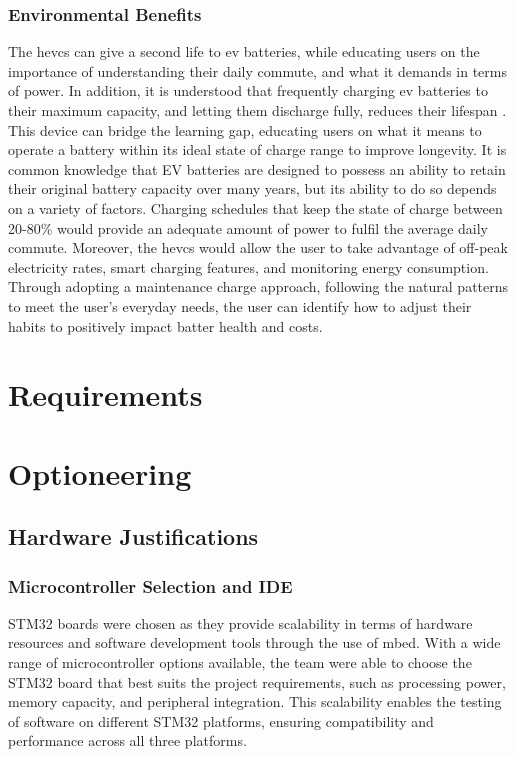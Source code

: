 \documentclass [12pt]{article}
\begin{document}
\subsubsection{Environmental Benefits}
The \gls{hevcs} can give a second life to \gls{ev} batteries, while educating users on the importance of understanding their daily commute, and what it demands in terms of power. In addition, it is understood that frequently charging \gls{ev} batteries to their maximum capacity, and letting them discharge fully, reduces their lifespan \cite{haram2021feasibility}. This device can bridge the learning gap, educating users on what it means to operate a battery within its ideal state of charge range to improve longevity. 
It is common knowledge that EV batteries are designed to possess an ability to retain their original battery capacity over many years, but its ability to do so depends on a variety of factors. Charging schedules that keep the state of charge between 20-80\% would provide an adequate amount of power to fulfil the average daily commute. Moreover, the \gls{hevcs} would allow the user to take advantage of off-peak electricity rates, smart charging features, and monitoring energy consumption. Through adopting a maintenance charge approach, following the natural patterns to meet the user’s everyday needs, the user can identify how to adjust their habits to positively impact batter health and costs.


\newpage
\section{Requirements}

\newpage
\section{Optioneering}

\subsection{Hardware Justifications}

\subsubsection{Microcontroller Selection and IDE}
STM32 boards were chosen as they provide scalability in terms of hardware resources and software development tools through the use of mbed. With a wide range of microcontroller options available, the team were able to choose the STM32 board that best suits the project requirements, such as processing power, memory capacity, and peripheral integration. This scalability enables the testing of software on different STM32 platforms, ensuring compatibility and performance across all three platforms.
\end{document}
